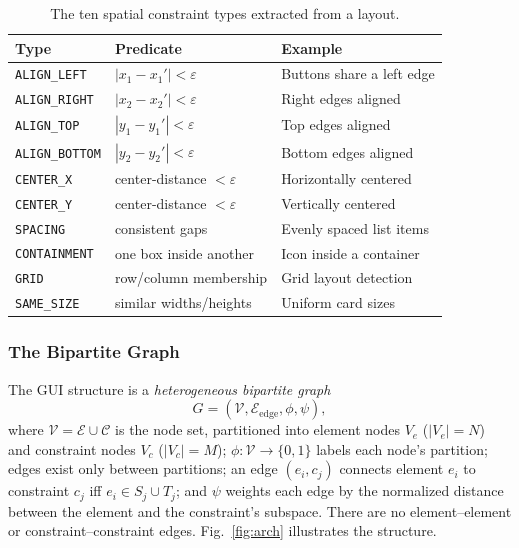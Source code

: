 \documentclass[11pt, letterpaper]{article}
\begin{document}
\begin{table}[htbp]
\caption{The ten spatial constraint types extracted from a layout.}
\label{tab:constraints}
\centering
\begin{tabularx}{\textwidth}{lXX}
\toprule
\textbf{Type} & \textbf{Predicate} & \textbf{Example} \\
\midrule
\texttt{ALIGN\_LEFT} & $|x_1-x_1'|<\varepsilon$ & Buttons share a left edge \\
\texttt{ALIGN\_RIGHT} & $|x_2-x_2'|<\varepsilon$ & Right edges aligned \\
\texttt{ALIGN\_TOP} & $|y_1-y_1'|<\varepsilon$ & Top edges aligned \\
\texttt{ALIGN\_BOTTOM} & $|y_2-y_2'|<\varepsilon$ & Bottom edges aligned \\
\texttt{CENTER\_X} & center-distance $<\varepsilon$ & Horizontally centered \\
\texttt{CENTER\_Y} & center-distance $<\varepsilon$ & Vertically centered \\
\texttt{SPACING} & consistent gaps & Evenly spaced list items \\
\texttt{CONTAINMENT} & one box inside another & Icon inside a container \\
\texttt{GRID} & row/column membership & Grid layout detection \\
\texttt{SAME\_SIZE} & similar widths/heights & Uniform card sizes \\
\bottomrule
\end{tabularx}
\end{table}

\subsubsection{The Bipartite Graph}
The GUI structure is a \emph{heterogeneous bipartite graph}
\begin{equation}
G=(\mathcal{V},\mathcal{E}_{\text{edge}},\phi,\psi),
\label{eq:graph}
\end{equation}
where $\mathcal{V}=\mathcal{E}\cup\mathcal{C}$ is the node set, partitioned
into element nodes $V_e$ ($|V_e|=N$) and constraint nodes $V_c$ ($|V_c|=M$);
$\phi:\mathcal{V}\to\{0,1\}$ labels each node's partition; edges exist only
between partitions; an edge $(e_i,c_j)$ connects element $e_i$ to
constraint $c_j$ iff $e_i\in S_j\cup T_j$; and $\psi$ weights each edge by
the normalized distance between the element and the constraint's subspace.
There are no element--element or constraint--constraint edges. Fig.~\ref{fig:arch}
illustrates the structure.
\end{document}
